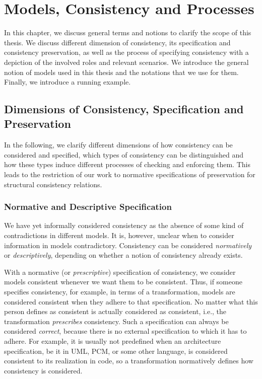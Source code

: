 \chapter{Models, Consistency and Processes
}
\label{chap:networks}

In this chapter, we discuss general terms and notions to clarify the scope of this thesis.
We discuss different dimension of consistency, its specification and consistency preservation, as well as the process of specifying consistency with a depiction of the involved roles and relevant scenarios.
We introduce the general notion of models used in this thesis and the notations that we use for them.
Finally, we introduce a running example.


\section{Dimensions of Consistency, Specification and Preservation}

In the following, we clarify different dimensions of how consistency can be considered and specified, which types of consistency can be distinguished and how these types induce different processes of checking and enforcing them.
This leads to the restriction of our work to normative specifications of preservation for structural consistency relations.

\subsection{Normative and Descriptive Specification}
\label{chap:networks:notions:normative_descriptive}

We have yet informally considered consistency as the absence of some kind of contradictions in different models.
It is, however, unclear when to consider information in models contradictory.
Consistency can be considered \emph{normatively} or \emph{descriptively}, depending on whether a notion of consistency already exists.

With a normative (or \emph{prescriptive}) specification of consistency, we consider models consistent whenever we want them to be consistent.
Thus, if someone specifies consistency, for example, in terms of a transformation, models are considered consistent when they adhere to that specification.
No matter what this person defines as consistent is actually considered as consistent, i.e., the transformation \emph{prescribes} consistency.
Such a specification can always be considered \emph{correct}, because there is no external specification to which it has to adhere.
For example, it is usually not predefined when an architecture specification, be it in \gls{UML}, \gls{PCM}, or some other language, is considered consistent to its realization in code, so a transformation normatively defines how consistency is considered.

